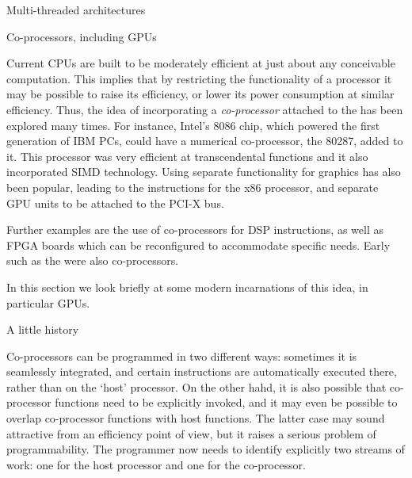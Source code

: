 
 {Multi-threaded architectures}
\label{sec:mta}


 {Co-processors, including GPUs}
\label{sec:copprocessor}

Current CPUs are built to be moderately efficient at just about any
conceivable computation. This implies that by restricting the
functionality of a processor it may be possible to raise its
efficiency, or lower its power consumption at similar
efficiency. Thus, the idea of incorporating a \emph{co-processor}
attached to the 
has been explored many times. For instance, Intel's 8086 chip, which
powered the first generation of IBM PCs, could have a numerical
co-processor, the 80287, added to it. This processor was very
efficient at transcendental functions and it also incorporated
\ac{SIMD} technology. Using separate functionality for graphics has also
been popular, leading to the  instructions for the x86 processor,
and separate \ac{GPU} units to be attached to the PCI-X bus.

Further examples are the use of co-processors
  for \ac{DSP} instructions, as well as \ac{FPGA} boards which can be
  reconfigured to accommodate specific needs.
Early 
such as the  were also co-processors.

In this section we look briefly at some modern incarnations of this idea,
in particular \acp{GPU}.

 {A little history}

Co-processors can be programmed in two different ways: sometimes 
it is seamlessly integrated, and certain instructions are
automatically executed there, rather than on the `host' processor. On
the other hahd, it is also possible that co-processor functions need
to be explicitly invoked, and it may even be possible to overlap
co-processor functions with host functions. The latter case may sound
attractive from an efficiency point of view, but it raises a serious
problem of programmability. The programmer now needs to identify
explicitly two streams of work: one for the host processor and one for
the co-processor.

